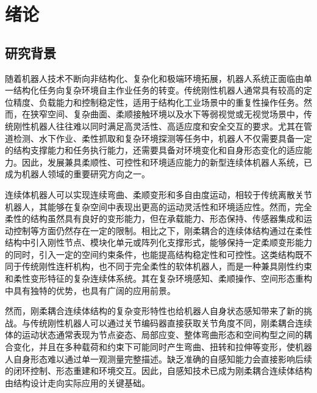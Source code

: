 \chapter{绪论}
\section{研究背景}
随着机器人技术不断向非结构化、复杂化和极端环境拓展，机器人系统正面临由单一结构化任务向复杂环境自主作业任务的转变。传统刚性机器人通常具有较高的定位精度、负载能力和控制稳定性，适用于结构化工业场景中的重复性操作任务。然而，在狭窄空间、复杂曲面、柔顺接触环境以及水下等弱视觉或无视觉场景中，传统刚性机器人往往难以同时满足高灵活性、高适应度和安全交互的要求。尤其在管道检测、水下作业、柔性抓取和复杂环境探测等任务中，机器人不仅需要具备一定的结构支撑能力和任务执行能力，还需要具备对环境变化和自身形态变化的适应能力。因此，发展兼具柔顺性、可控性和环境适应能力的新型连续体机器人系统，已成为机器人领域的重要研究方向之一。

连续体机器人可以实现连续弯曲、柔顺变形和多自由度运动，相较于传统离散关节机器人，其能够在复杂空间中表现出更高的运动灵活性和环境适应性。然而，完全柔性的结构虽然具有良好的变形能力，但在承载能力、形态保持、传感器集成和运动控制等方面仍然存在一定的限制。相比之下，刚柔耦合的连续体结构通过在柔性结构中引入刚性节点、模块化单元或阵列化支撑形式，能够保持一定柔顺变形能力的同时，引入一定的空间约束条件，也能提高结构稳定性和可控性。这类结构既不同于传统刚性连杆机构，也不同于完全柔性的软体机器人，而是一种兼具刚性约束和柔性变形特征的复杂连续体系统。其在复杂环境感知、柔顺操作、空间形态重构中具有独特的优势，也具有广阔的应用前景。

然而，刚柔耦合连续体结构的复杂变形特性也给机器人自身状态感知带来了新的挑战。与传统刚性机器人可以通过关节编码器直接获取关节角度不同，刚柔耦合连续体的运动状态通常表现为节点姿态、局部应变、整体弯曲形态和空间构型之间的耦合变化，并且在多种载荷和约束下可能同时产生弯曲、扭转和拉伸等变形，使机器人自身形态难以通过单一观测量完整描述。缺乏准确的自感知能力会直接影响后续的闭环控制、形态重建和环境交互。因此，自感知技术已成为刚柔耦合连续体结构由结构设计走向实际应用的关键基础。


